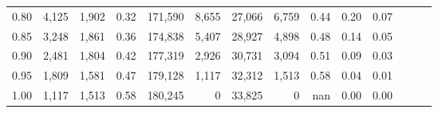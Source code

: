 \begin{tabular}{rrrrrrrrrrrrrr}
0.80 &   4,125 &  1,902 &  0.32 &  171,590 &    8,655 &  27,066 &   6,759 &  0.44 &  0.20 &      0.07 \\
0.85 &   3,248 &  1,861 &  0.36 &  174,838 &    5,407 &  28,927 &   4,898 &  0.48 &  0.14 &      0.05 \\
0.90 &   2,481 &  1,804 &  0.42 &  177,319 &    2,926 &  30,731 &   3,094 &  0.51 &  0.09 &      0.03 \\
0.95 &   1,809 &  1,581 &  0.47 &  179,128 &    1,117 &  32,312 &   1,513 &  0.58 &  0.04 &      0.01 \\
1.00 &   1,117 &  1,513 &  0.58 &  180,245 &        0 &  33,825 &       0 &   nan &  0.00 &      0.00 \\
\bottomrule
\end{tabular}
